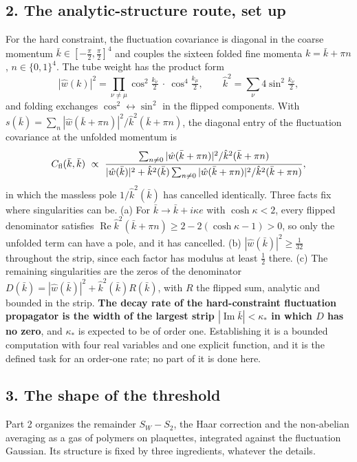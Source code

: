 \documentclass[11pt,a4paper]{article}
\begin{document}
\hypertarget{the-analytic-structure-route-set-up}{%
\subsection{2. The analytic-structure route, set
up}\label{the-analytic-structure-route-set-up}}

For the hard constraint, the fluctuation covariance is diagonal in the
coarse momentum \(\bar k\in[-\tfrac\pi2,\tfrac\pi2]^4\) and couples the
sixteen folded fine momenta \(k=\bar k+\pi n\), \(n\in\{0,1\}^4\). The
tube weight has the product form
\[|\hat w(k)|^2=\prod_{\nu\ne\mu}\cos^2\tfrac{k_\nu}2\ \cdot\ \cos^4\tfrac{k_\mu}2,
\qquad\hat k^2=\sum_\nu4\sin^2\tfrac{k_\nu}2,\] and folding exchanges
\(\cos^2\leftrightarrow\sin^2\) in the flipped components. With
\(s(\bar k)=\sum_n|\hat w(\bar k+\pi n)|^2/\hat k^2(\bar k+\pi n)\), the
diagonal entry of the fluctuation covariance at the unfolded momentum is
\[C_{\rm fl}(\bar k,\bar k)\ \propto\ \frac{\sum_{n\ne0}|\hat w(\bar k+\pi n)|^2/\hat k^2(\bar k+\pi n)}
{|\hat w(\bar k)|^2+\hat k^2(\bar k)\sum_{n\ne0}|\hat w(\bar k+\pi n)|^2/\hat k^2(\bar k+\pi n)},\]
in which the massless pole \(1/\hat k^2(\bar k)\) has cancelled
identically. Three facts fix where singularities can be. (a) For
\(\bar k\to\bar k+i\kappa e\) with \(\cosh\kappa<2\), every flipped
denominator satisfies
\(\operatorname{Re}\hat k^2(\bar k+\pi n)\ge2-2(\cosh\kappa-1)>0\), so
only the unfolded term can have a pole, and it has cancelled. (b)
\(|\hat w(\bar k)|^2\ge\tfrac1{32}\) throughout the strip, since each
factor has modulus at least \(\tfrac12\) there. (c) The remaining
singularities are the zeros of the denominator
\(D(\bar k)=|\hat w(\bar k)|^2+\hat k^2(\bar k)R(\bar k)\), with \(R\)
the flipped sum, analytic and bounded in the strip. \textbf{The decay
rate of the hard-constraint fluctuation propagator is the width of the
largest strip \(|\operatorname{Im}\bar k|<\kappa_*\) in which \(D\) has
no zero}, and \(\kappa_*\) is expected to be of order one. Establishing
it is a bounded computation with four real variables and one explicit
function, and it is the defined task for an order-one rate; no part of
it is done here.

\hypertarget{the-shape-of-the-threshold}{%
\subsection{3. The shape of the
threshold}\label{the-shape-of-the-threshold}}

Part 2 organizes the remainder \(S_W-S_2\), the Haar correction and the
non-abelian averaging as a gas of polymers on plaquettes, integrated
against the fluctuation Gaussian. Its structure is fixed by three
ingredients, whatever the details.
\end{document}
